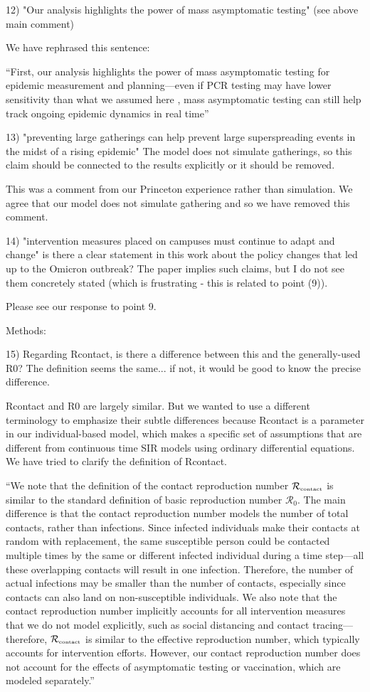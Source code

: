 \documentclass[12pt]{article}
\newcommand{\Rx}[1]{\ensuremath{{\mathcal R}_{#1}}}
\newcommand{\Rc}{\Rx{\textrm{\tiny{contact}}}}
\newcommand{\RR}{\ensuremath{{\mathcal R}}}
\newcommand{\revtext}{\textsf}
\begin{document}
\revtext{12) "Our analysis highlights the power of mass asymptomatic testing" (see above main comment)}

We have rephrased this sentence:

``First, our analysis highlights the power of mass asymptomatic testing for epidemic measurement and planning---even if PCR testing may have lower sensitivity than what we assumed here \citep{hellewell2021estimating}, mass asymptomatic testing can still help track ongoing epidemic dynamics in real time''

\revtext{13) "preventing large gatherings can help prevent large superspreading events in the midst of a rising epidemic" The model does not simulate gatherings, so this claim should be connected to the results explicitly or it should be removed.}

This was a comment from our Princeton experience rather than simulation. We agree that our model does not simulate gathering and so we have removed this comment.

\revtext{14) "intervention measures placed on campuses must continue to adapt and change" is there a clear statement in this work about the policy changes that led up to the Omicron outbreak? The paper implies such claims, but I do not see them concretely stated (which is frustrating - this is related to point (9)).}

Please see our response to point 9.

\revtext{Methods:}

\revtext{15) Regarding Rcontact, is there a difference between this and the generally-used R0? The definition seems the same... if not, it would be good to know the precise difference.}

Rcontact and R0 are largely similar. But we wanted to use a different terminology to emphasize their subtle differences because Rcontact is a parameter in our individual-based model, which makes a specific set of assumptions that are different from continuous time SIR models using ordinary differential equations. We have tried to clarify the definition of Rcontact. 

``We note that the definition of the contact reproduction number $\Rc$ is similar to the standard definition of basic reproduction number $\RR_0$.
The main difference is that the contact reproduction number models the number of total contacts, rather than infections. 
Since infected individuals make their contacts at random with replacement, the same susceptible person could be contacted multiple times by the same or different infected individual during a time step---all these overlapping contacts will result in one infection.
Therefore, the number of actual infections may be smaller than the number of contacts, especially since contacts can also land on non-susceptible individuals.
We also note that the contact reproduction number implicitly accounts for all intervention measures that we do not model explicitly, such as social distancing and contact tracing---therefore, $\Rc$ is similar to the effective reproduction number, which typically accounts for intervention efforts.
However, our contact reproduction number does not account for the effects of asymptomatic testing or vaccination, which are modeled separately.''
\end{document}
